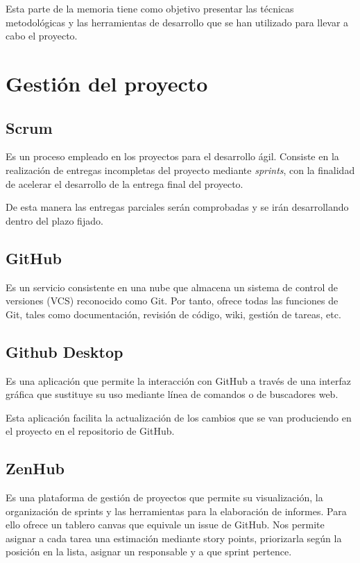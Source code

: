 
Esta parte de la memoria tiene como objetivo presentar las técnicas metodológicas y las herramientas de desarrollo que se han utilizado para llevar a cabo el proyecto. 

\section{Gestión del proyecto}
\subsection{Scrum}
\cite{Scrum} Es un proceso empleado en los proyectos para el desarrollo ágil. Consiste en la realización de entregas incompletas del proyecto mediante \emph{sprints}, con la finalidad de acelerar el desarrollo de la entrega final del proyecto. 

De esta manera las entregas parciales serán comprobadas y se irán desarrollando dentro del plazo fijado. 
\subsection{GitHub}
\cite{GitHub} Es un servicio  consistente en una nube que almacena un sistema de control de versiones (VCS) reconocido como Git. Por tanto, ofrece todas las funciones de Git, tales como documentación, revisión de código, wiki, gestión de tareas, etc.

\subsection{Github Desktop}
\cite{GitHub_Desktop} Es una aplicación que permite la interacción con GitHub a través de una interfaz gráfica que sustituye su uso mediante línea de comandos o de buscadores web.

Esta aplicación facilita la actualización de los cambios que se van produciendo en el proyecto en el repositorio de GitHub.

\subsection{ZenHub}
\cite{ZenHub} Es una plataforma de gestión de proyectos que permite su visualización, la organización de sprints y las herramientas para la elaboración de informes. Para ello ofrece un tablero canvas que equivale un issue de GitHub. 
Nos permite asignar a cada tarea una estimación mediante story points, priorizarla según la posición en la lista, asignar un responsable y a que sprint pertence.

